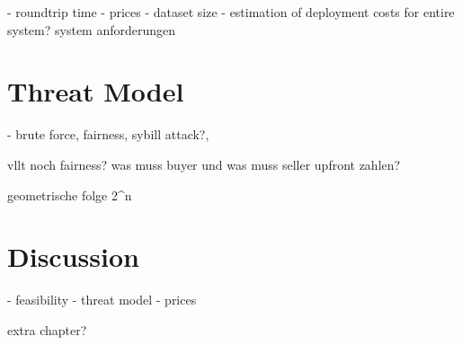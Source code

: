 - roundtrip time
- prices
- dataset size
- estimation of deployment costs for entire system? system anforderungen


\section{Threat Model}

- brute force, fairness, sybill attack?, 

vllt noch fairness? was muss buyer und was muss seller upfront zahlen?

geometrische folge 2^n

\section{Discussion}

- feasibility
- threat model
- prices

extra chapter?